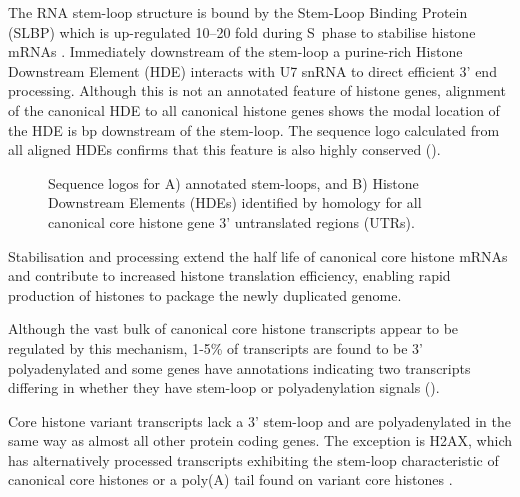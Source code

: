   The RNA stem-loop structure is bound by the Stem-Loop Binding Protein (SLBP)
  which is up-regulated 10--20 fold during S~phase to stabilise
  histone mRNAs \citep{SLBP-regulation}.
  Immediately downstream of the stem-loop a purine-rich Histone Downstream Element (HDE)
  interacts with U7 snRNA to direct efficient 3' end processing.
  Although this is not an annotated feature of histone genes,
  alignment of the canonical HDE \citep{HDE-sequence} to all canonical histone genes
  shows the modal location of the HDE is 
  \HDEsDistanceFromStemLoop{} bp downstream of the stem-loop.
  The sequence logo calculated from all aligned HDEs 
  confirms that this feature is also highly conserved ().

  \begin{figure}
    \centering
    \hfill
    \caption{%
      Sequence logos for A) annotated stem-loops, and 
      B) Histone Downstream Elements (HDEs) identified by homology
      for all canonical core histone gene 3' untranslated regions (UTRs).
    }
  \end{figure}

  Stabilisation and processing extend the half life of canonical core histone \mbox{mRNAs}
  and contribute to increased histone translation efficiency,
  enabling rapid production of histones to package the newly duplicated genome.

  Although the vast bulk of canonical core histone transcripts 
  appear to be regulated by this mechanism, 
  1-5\% of transcripts are found to be 3' polyadenylated \citep{YangGenomeBiol2011}
  and some genes have annotations indicating two transcripts
  differing in whether they have stem-loop or polyadenylation signals ().

  Core histone variant transcripts lack a 3' stem-loop and are
  polyadenylated in the same way as almost all other protein coding genes.
  The exception is H2AX, which has alternatively processed transcripts
  exhibiting the stem-loop characteristic of canonical core histones
  or a poly(A) tail found on variant core histones \citep{HTwoAX-transcripts,our-H2AX-review}.
